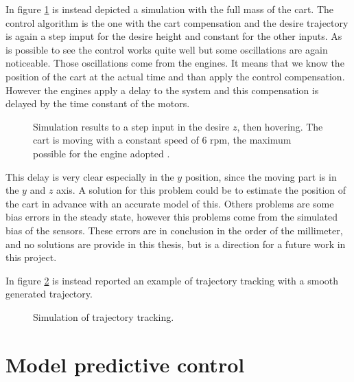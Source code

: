 \noindent In figure \ref{fig:simulation2} is instead depicted a simulation with the full mass of the cart. The control algorithm is the one with the cart compensation and the desire trajectory is again a step imput for the desire height and constant for the other inputs. As is possible to see the control works quite well but some oscillations are again noticeable. Those oscillations come from the engines. It means that we know the position of the cart at the actual time and than apply the control compensation. However the engines apply a delay to the system and this compensation is delayed by the time constant of the motors. 

\begin{figure}[h]
	\centering
 	
 	\caption{Simulation results to a step input in the desire $z$, then hovering. The cart is moving with a constant speed of $6$ rpm, the maximum possible for the engine adopted \cite{Carlos}.}
 	\label{fig:simulation2}		
\end{figure}

\noindent This delay is very clear especially in the $y$ position, since the moving part is in the $y$ and $z$ axis. A solution for this problem could be to estimate the position of the cart in advance with an accurate model of this. Others problems are some bias errors in the steady state, however this problems come from the simulated bias of the sensors. These errors are in conclusion in the order of the millimeter, and no solutions are provide in this thesis, but is a direction for a future work in this project.

\noindent In figure \ref{fig:trajectoryTrackingLee} is instead reported an example of trajectory tracking with a smooth generated trajectory.

\begin{figure}[h!]
	\centering
	\hspace{11pt}
	\hspace{-5pt}
	\caption{Simulation of trajectory tracking.}
	\label{fig:trajectoryTrackingLee}		
\end{figure}


\section{Model predictive control}

